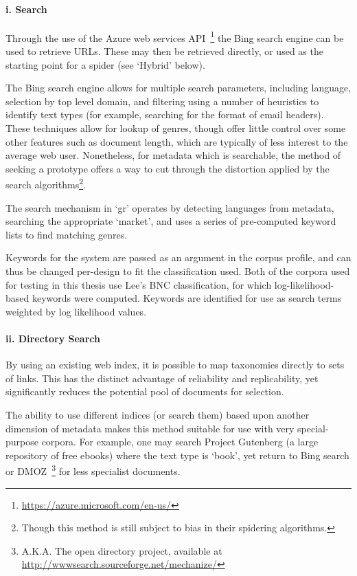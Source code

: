 \paragraph{i. Search}
Through the use of the Azure web services API~\footnote{\url{https://azure.microsoft.com/en-us/}} the Bing search engine can be used to retrieve URLs.  These may then be retrieved directly, or used as the starting point for a spider (see `Hybrid' below).

The Bing search engine allows for multiple search parameters, including language, selection by top level domain, and filtering using a number of heuristics to identify text types (for example, searching for the format of email headers).  These techniques allow for lookup of genres, though offer little control over some other features such as document length, which are typically of less interest to the average web user.  Nonetheless, for metadata which is searchable, the method of seeking a prototype offers a way to cut through the distortion applied by the search algorithms\footnote{Though this method is still subject to bias in their spidering algorithms.}.

The search mechanism in `gr' operates by detecting languages from metadata, searching the appropriate `market', and uses a series of pre-computed keyword lists to find matching genres.

Keywords for the system are passed as an argument in the corpus profile, and can thus be changed per-design to fit the classification used.  Both of the corpora used for testing in this thesis use Lee's BNC classification, for which log-likelihood-based keywords were computed.  Keywords are identified for use as search terms weighted by log likelihood values.


\paragraph{ii. Directory Search}
By using an existing web index, it is possible to map taxonomies directly to sets of links.  This has the distinct advantage of reliability and replicability, yet significantly reduces the potential pool of documents for selection.

The ability to use different indices (or search them) based upon another dimension of metadata makes this method suitable for use with very special-purpose corpora.  For example, one may search Project Gutenberg (a large repository of free ebooks) where the text type is `book', yet return to Bing search or DMOZ~\footnote{A.K.A. The open directory project, available at \url{http://wwwsearch.sourceforge.net/mechanize/}} for less specialist documents.

